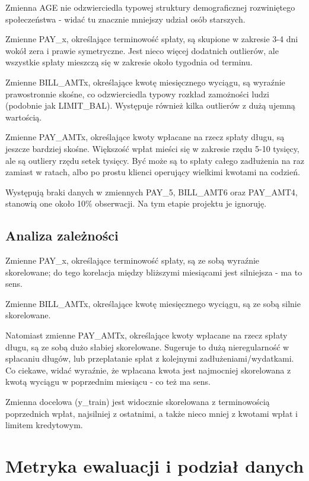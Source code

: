 \documentclass[a4paper,10pt]{article}
\begin{document}
Zmienna AGE nie odzwierciedla typowej struktury demograficznej rozwiniętego społeczeństwa - widać tu znacznie mniejszy udział osób starszych.

Zmienne PAY\_x, określające terminowość spłaty, są skupione w zakresie 3-4 dni wokół zera i prawie symetryczne.
Jest nieco więcej dodatnich outlierów, ale wszystkie spłaty mieszczą się w zakresie około tygodnia od terminu.

Zmienne BILL\_AMTx, określające kwotę miesięcznego wyciągu, są wyraźnie prawostronnie skośne, co odzwierciedla typowy rozkład zamożności ludzi (podobnie jak LIMIT\_BAL). Występuje również kilka outlierów z dużą ujemną wartością.

Zmienne PAY\_AMTx, określające kwoty wpłacane na rzecz spłaty długu, są jeszcze bardziej skośne.
Większość wpłat mieści się w zakresie rzędu 5-10 tysięcy, ale są outliery rzędu setek tysięcy.
Być może są to spłaty całego zadłużenia na raz zamiast w ratach, albo po prostu klienci operujący wielkimi kwotami na codzień.

Występują braki danych w zmiennych PAY\_5, BILL\_AMT6 oraz PAY\_AMT4, stanowią one około 10\% obserwacji. Na tym etapie projektu je ignoruję.

\subsection{Analiza zależności}

Zmienne PAY\_x, określające terminowość spłaty, są ze sobą wyraźnie skorelowane; do tego korelacja między bliższymi miesiącami jest silniejsza -  ma to sens.

Zmienne BILL\_AMTx, określające kwotę miesięcznego wyciągu, są ze sobą silnie skorelowane.

Natomiast zmienne PAY\_AMTx, określające kwoty wpłacane na rzecz spłaty długu, są ze sobą dużo słabiej skorelowane.
Sugeruje to dużą nieregularność w spłacaniu długów, lub przeplatanie spłat z kolejnymi zadłużeniami/wydatkami.
Co ciekawe, widać wyraźnie, że wpłacana kwota jest najmocniej skorelowana z kwotą wyciągu w poprzednim miesiącu - co też ma sens.

Zmienna docelowa (y\_train) jest widocznie skorelowana z terminowością poprzednich wpłat, najsilniej z ostatnimi, a także nieco mniej z kwotami wpłat i limitem kredytowym.

\section{Metryka ewaluacji i podział danych}
\end{document}
